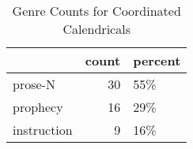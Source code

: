 \begin{table}[htbp!]
\centering
\caption{Genre Counts for Coordinated Calendricals}
\label{table:cal_gen_cp}
\begin{tabular}{lrl}
\toprule
{} &  count & percent \\
\midrule
prose-N     &     30 &     55\% \\
prophecy    &     16 &     29\% \\
instruction &      9 &     16\% \\
\bottomrule
\end{tabular}
\end{table}
